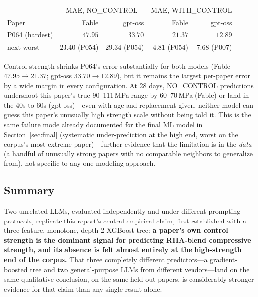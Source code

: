 \documentclass[11pt]{article}
\begin{document}
\begin{center}\small
\begin{tabular}{lrrrr}
\toprule
& \multicolumn{2}{c}{MAE, NO\_CONTROL} & \multicolumn{2}{c}{MAE, WITH\_CONTROL} \\
Paper & Fable & gpt-oss & Fable & gpt-oss \\
\midrule
P064 (hardest) & $47.95$ & $33.70$ & $21.37$ & $12.89$ \\
next-worst & $23.40$ (P054) & $29.34$ (P054) & $4.81$ (P054) & $7.68$ (P007) \\
\bottomrule
\end{tabular}
\end{center}

\noindent Control strength shrinks P064's error substantially for both models (Fable
$47.95\to21.37$; gpt-oss $33.70\to12.89$), but it remains the largest per-paper error by
a wide margin in every configuration. At 28 days, NO\_CONTROL predictions undershoot
this paper's true 90--111\,MPa range by 60--70\,MPa (Fable) or land in the 40s-to-60s
(gpt-oss)---even with age and replacement given, neither model can guess this paper's
unusually high strength scale without being told it. This is the same failure mode
already documented for the final ML model in Section~\ref{sec:final} (systematic
under-prediction at the high end, worst on the corpus's most extreme paper)---further
evidence that the limitation is in the \emph{data} (a handful of unusually strong papers
with no comparable neighbors to generalize from), not specific to any one modeling
approach.

\subsection{Summary}
Two unrelated LLMs, evaluated independently and under different prompting protocols,
replicate this report's central empirical claim, first established with a
three-feature, monotone, depth-2 XGBoost tree: \textbf{a paper's own control strength
is the dominant signal for predicting RHA-blend compressive strength, and its absence
is felt almost entirely at the high-strength end of the corpus.} That three completely
different predictors---a gradient-boosted tree and two general-purpose LLMs from
different vendors---land on the same qualitative conclusion, on the same held-out
papers, is considerably stronger evidence for that claim than any single result alone.

\end{document}
